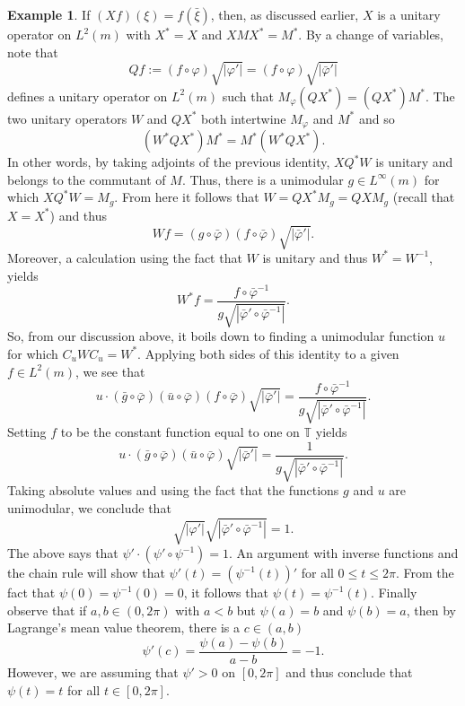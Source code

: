 \documentclass{dis}
\theoremstyle{plain}
\theoremstyle{definition}
\newtheorem{Example}[equation]{Example}
\def\T{\mathbb{T}}
\renewcommand{\leq}{\leqslant}
\renewcommand{\phi}{\varphi}
\newcommand{\0}{{\color{lightgray}0}}
\begin{document}
\begin{Example}
If $(X f)(\xi) = f(\bar{\xi})$, then, as discussed earlier,  $X$ is a unitary operator on $L^2(m)$ with $X^{*} = X$ and $X M X^{*} = M^{*}$. 
By a change of variables, note that 
$$Q f := (f \circ  \phi) \sqrt{|\phi'|} =(f \circ  \phi) \sqrt{|\bar \phi'|} $$ defines a unitary operator on $L^2(m)$ such that $M_{\phi} (Q X^{*}) = (Q X^{*}) M^{*}$. 
The two unitary operators $W$ and $Q X^{*}$ both intertwine $M_{\phi}$ and $M^{*}$ and so $$(W^{*} Q X^{*}) M^{*} = M^{*} (W^{*} Q X^{*}).$$  In other words, by taking adjoints of the previous identity, $X Q^{*} W$  is unitary and belongs to the commutant of $M$. Thus, there is a unimodular $g \in L^{\infty}(m)$ for which $X Q^{*} W = M_{g}$. From here it follows  that 
$W = Q X^{*} M_g = Q X M_{g}$ (recall that $X = X^{*}$) and thus  
$$W f = (g \circ  \bar \phi) (f \circ \bar \phi) \sqrt{|\bar \phi'|}.$$
Moreover, a calculation using the fact that $W$ is unitary and thus $W^{*}  = W^{-1}$,  yields
$$W^{*} f = \frac{f \circ \bar\phi^{-1}}{g  \sqrt{|\bar\phi' \circ \bar \phi^{-1}|}}.$$
So, from our discussion above, it boils down to finding a unimodular function $u$ for which $C_{u} W C_{u} = W^{*}$. Applying both sides of this identity to a  given $f \in L^2(m)$, we see that
$$u \cdot (\bar g \circ \bar \phi) (\bar u \circ \bar \phi ) (f \circ \bar \phi) \sqrt{|\bar \phi'|} =  \frac{f \circ \bar \phi^{-1}}{g  \sqrt{|\bar \phi' \circ \bar \phi^{-1}|}}.$$ Setting  $f$ to be the constant function equal to one on $\T$ yields 
$$u \cdot (\bar g \circ \bar \phi) (\bar u \circ \bar \phi)  \sqrt{|\bar \phi'|} = \frac{1}{g  \sqrt{|\bar \phi' \circ \bar \phi^{-1}|}}.$$
Taking absolute values and using the fact that  the functions $g$ and $u$ are unimodular, we conclude that 
$$\sqrt{|\phi'|} \sqrt{|\bar \phi' \circ \bar \phi^{-1}|} = 1.$$
The above says that 
$\psi' \cdot (\psi' \circ \psi^{-1}) = 1$. An argument with inverse functions and the chain rule will show that $\psi'(t) = (\psi^{-1}(t))'$ for all $0 \leq t \leq 2\pi$. From the fact that $\psi(0) = \psi^{-1}(0) = 0$, it follows that $\psi(t) = \psi^{-1}(t)$. 
Finally observe that if $a, b \in (0, 2 \pi)$ with $a < b$ but $\psi(a) = b$ and $\psi(b) = a$, then by Lagrange's mean value theorem, there is a $c \in (a, b)$ 
$$\psi'(c) = \frac{\psi(a) - \psi(b)}{a - b} = -1.$$
However, we are assuming that $\psi' > 0$ on $[0, 2 \pi]$ and thus  conclude that $\psi(t) = t$ for all $t \in [0, 2 \pi]$.



\end{Example}
\end{document}
